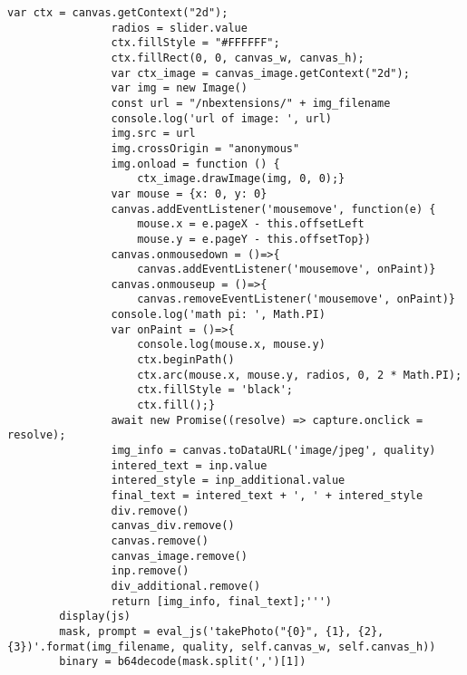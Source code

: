 \begin{lstlisting}[basicstyle=\ttfamily\small]
                var ctx = canvas.getContext("2d");
                radios = slider.value
                ctx.fillStyle = "#FFFFFF";
                ctx.fillRect(0, 0, canvas_w, canvas_h);
                var ctx_image = canvas_image.getContext("2d");
                var img = new Image()
                const url = "/nbextensions/" + img_filename
                console.log('url of image: ', url)
                img.src = url
                img.crossOrigin = "anonymous"
                img.onload = function () {
                    ctx_image.drawImage(img, 0, 0);}
                var mouse = {x: 0, y: 0}
                canvas.addEventListener('mousemove', function(e) {
                    mouse.x = e.pageX - this.offsetLeft
                    mouse.y = e.pageY - this.offsetTop})
                canvas.onmousedown = ()=>{
                    canvas.addEventListener('mousemove', onPaint)}
                canvas.onmouseup = ()=>{
                    canvas.removeEventListener('mousemove', onPaint)}
                console.log('math pi: ', Math.PI)
                var onPaint = ()=>{
                    console.log(mouse.x, mouse.y)
                    ctx.beginPath()
                    ctx.arc(mouse.x, mouse.y, radios, 0, 2 * Math.PI);
                    ctx.fillStyle = 'black';
                    ctx.fill();}
                await new Promise((resolve) => capture.onclick = resolve);
                img_info = canvas.toDataURL('image/jpeg', quality)
                intered_text = inp.value
                intered_style = inp_additional.value
                final_text = intered_text + ', ' + intered_style
                div.remove()
                canvas_div.remove()
                canvas.remove()
                canvas_image.remove()
                inp.remove()
                div_additional.remove()
                return [img_info, final_text];''')
        display(js)
        mask, prompt = eval_js('takePhoto("{0}", {1}, {2}, {3})'.format(img_filename, quality, self.canvas_w, self.canvas_h))
        binary = b64decode(mask.split(',')[1])
        \end{lstlisting}
